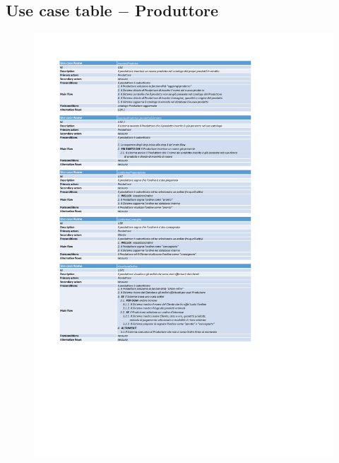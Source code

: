 \newpage
\subsection{Use case table $-$ Produttore}
\begin{figure}[h!]
    \centering
    \includegraphics[trim= 1.8cm 8cm 5cm 1.9cm, clip]{Deliverables/first-deliverable/img/UseCase/UseCase-Table-Producer.pdf}
\end{figure}

\newpage
